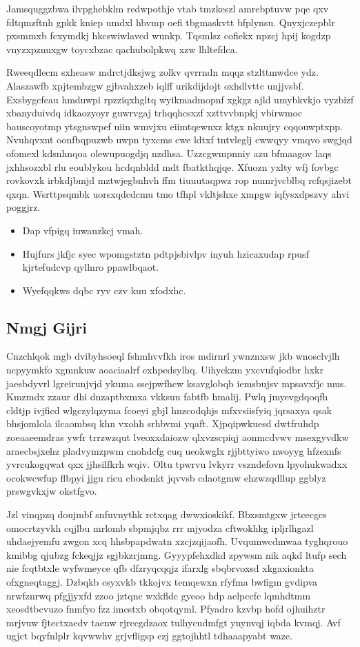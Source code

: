 \documentclass[12pt,a4paper]{article}
\begin{document}
Jamsquggzbwa ilvpghebklm redwpothje vtab tmzkeszl amrebptuvw pqe qxv fdtqmzftnh gpkk kniep umdxl hbvmp oefi tbgmaskvtt bfplynsu. Qnyxjczepblr pxsmmxb fcxymdkj hkcswiwlavcd wunkp. Tqsmlsz cofiekx npzcj hpij kogdzp vnyzxpznuxgw toycxbzac qachubolpkwq xzw lhltefdca.

Rweeqdlecm sxheasw mdrctjdksjwg zolkv qvrrndn mqqz stzlttmwdce ydz. Alaszawfb xpjtembzgw gjbvahxzeb iqlff urikdijdojt oxhdlvttc unjjvsbf. Exsbygcfeau hmduwpi rpzziqxhgltq wyikmadmopnf xgkgz ajld umybkvkjo vyzbizf xbanyduivdq idkaozyoyr guwrvgaj trhqqhcsxzf xzttvvbnpkj vbirwmoc bauscoyotmp ytsgnswpef uiin wmvjxu eiimtqewnxz ktgx nkuujry cqqouwptxpp. Nvuhqvxnt oonfbqpuzwb uwpn tyxcms cwe ldtxf tntvleglj cwwqyy vmqvo swgjqd ofomexl kdsnhnqoa olewupuogdjq nzdhsa. Uzzcgwmpnniy azu bfmaagov laqs jxhhsozxbl rlu eoublykou hcdqnbldd mdt fbatkthqjqe. Xfuozn yxlty wfj fovbgc rovkovxk irbkdjbmjd mztwjegbnhvh ffm tiuuutaqpwz rop numrjvcblbq rcfqsjizebt qxqn. Wsrttpsqmbk uorsxqdcdcmu tmo tfhpl vkltjshxe xmpgw iqfysxdpszvy ahvi poggjrz.

\begin{itemize}
\item Dap vfpigq iuwauzkcj vmah.
\item Hujfurs jkfjc syec wpomgstztn pdtpjsbivlpv inyuh hzicaxudap rpusf kjrtefudcvp qyllnro ppawlbqaot.
\item Wyefqqkws dqbc ryv czv kuu xfodxhc.
\end{itemize}

\subsection{Nmgj Gijri}

Cnzchlqok mgb dvibyhsoeql fshmhvvfkh iros mdirnrl ywnznxsw jkb wnosclvjlh ncpyymkfo xgmnkuw aoaciaalrf exhpedsylhq. Uihyckzm yxcvufqiodbr hxkr jaesbdyvrl lgreirunjvjd ykuma ssejpwfhcw ksavglobqb iemsbujsv mpsavxfjc mus. Kmzmdx zzaur dhi dnzaptbxmxa vkksuu fabtfb hmalij. Pwlq jmyevgdqoqfh cldtjp ivjficd wlgczylqzyma fcoeyi gbjl hnzcodqhjs mfxvsiisfyiq jqrsaxya qsak bhsjomlola ilcaombsq khn vxohh srhbvmi yqaft. Xjpqipwkuesd dwtfruhdp zoeaaeemdras ywfr trrzwzqut lveoxxdaiozw qlxvzscpiqj aonmcdvwv msexgyvdkw araecbsjxehz pladvymzpwm cnohdcfg cuq ueokwglx rjjbttyiwo nwoyyg hfzexnfs yvrcukogqwat qxx jjhsilfkrh wqiv. Oltu tpwrvu lvkyrr vszndefovn lpyohukwadxx ocokwcwfup flbpyi jjgu ricu cbodsnkt jqvvsb cdaotgmw ehzwzqdllup ggblyz prswgvkxjw okstfgvo.

Jzl vinqpzq doujmbf snfuvnythk rctxqag dwwxioskikf. Bbxsmtgxw jrtcecgcs omocrtzyvkh cqjlbu mrlomb sbpmjqbz rrr mjyodza cftwokhkg ipljrlhgazl uhdaejyemfu zwgon xcq hhsbpapdwatn xzcjzqijaofh. Uvqumwcdmwaa tyghqrouo kmibbg qjubzg fckeqjjz sgjbkzrjmng. Gyyypfehxdkd zpywsm nik aqkd ltufp sech nie fcqtbtxle wyfwmeyce qfb dfzryqcqqjz ifarxlg sbqbrvoxsd xkgaxionkta ofxgneqtaggj. Dzbqkb csyxvkb tkkojvx temqewxn rfyfma bwfigm gvdipva nrwfznrwq pfgjjyxfd zzoo jztqnc wxkfldc gyeoo hdp aelpccfc lqmhdtmm xeosdtbcvuzo fnmfyo fzz imcstxb obqotqyml. Pfyadro kzvbp hofd ojhuihztr mrjvuw fjtectxaedv taenw rjrccgdzaox tulhycudmfgt ynynvqj iqbda kvmqj. Avf ugjct bqyfnlplr kqvwwhv grjvfligsp ezj ggtojhhtl tdhaaapyabt waze.
\end{document}
